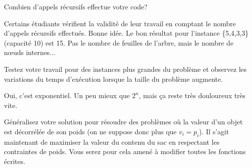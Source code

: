\documentclass[10pt]{article}\usepackage[nu]{esial}
\begin{document}
\Question Combien d'appels récursifs effectue votre code?

\begin{Reponse}
  Certains étudiants  vérifient la validité de leur travail en comptant le
  nombre d'appels récursifs effectués. Bonne idée. Le bon résultat pour
  l'instance \{5,4,3,3\} (capacité 10) est 15. Pas
  le nombre de feuilles de l'arbre, mais le nombre de nœuds internes...
\end{Reponse}

\Question Testez votre travail pour des instances plus grandes du problème et
observez les variations du temps d'exécution lorsque la taille du problème
augmente.

\begin{Reponse}
  Oui, c'est exponentiel. Un peu mieux que $2^n$, mais ça reste très douloureux
  très vite.
\end{Reponse}

\Question Généralisez votre solution pour résoudre des problèmes où la valeur
d'un objet est décorrélée de son poids (on ne suppose donc plus que $v_i=p_i$).
Il s'agit maintenant de maximiser la valeur du contenu du sac en respectant les
contraintes de poids. Vous serez pour cela amené à modifier toutes les fonctions
écrites. 
\end{document}
